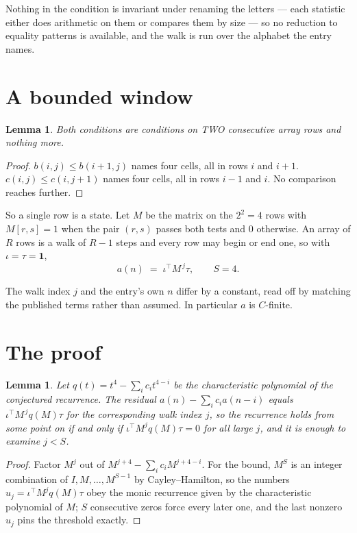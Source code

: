 \documentclass[11pt,a4paper]{article}
\theoremstyle{plain}
\newtheorem{lemma}[theorem]{Lemma}
\theoremstyle{definition}
\begin{document}
Nothing in the condition is invariant under renaming the letters --- each statistic either does
arithmetic on them or compares them by size --- so no reduction to equality patterns is
available, and the walk is run over the alphabet the entry names.

\section{A bounded window}

\begin{lemma}\label{lem:win}
Both conditions are conditions on TWO consecutive array rows and nothing more.
\end{lemma}

\begin{proof}
$b(i,j)\le b(i{+}1,j)$ names four cells, all in rows $i$ and $i+1$. $c(i,j)\le c(i,j{+}1)$
names four cells, all in rows $i-1$ and $i$. No comparison reaches further.
\end{proof}

So a single row is a state. Let $M$ be the matrix on the $2^{2}=4$ rows with
$M[r,s]=1$ when the pair $(r,s)$ passes both tests and $0$ otherwise. An array of $R$ rows is a
walk of $R-1$ steps and every row may begin or end one, so with $\iota=\tau=\mathbf{1}$,
\[
a(n)\;=\;\iota^{\!\top}M^{\,j}\tau ,\qquad S=4.
\]

The walk index $j$ and the entry's own $n$ differ by a constant, read off by matching the
published terms rather than assumed. In particular $a$ is $C$-finite.

\section{The proof}

\begin{lemma}\label{lem:crit}
Let $q(t)=t^{4}-\sum_i c_it^{4-i}$ be the characteristic polynomial of the
conjectured recurrence. The residual $a(n)-\sum_ic_ia(n-i)$ equals
$\iota^{\!\top}M^{\,j}q(M)\tau$ for the corresponding walk index $j$, so the recurrence
holds from some point on if and only if $\iota^{\!\top}M^{j}q(M)\tau=0$ for all large $j$,
and it is enough to examine $j<S$.
\end{lemma}

\begin{proof}
Factor $M^{j}$ out of $M^{j+4}-\sum_ic_iM^{j+4-i}$. For the bound, $M^{S}$
is an integer combination of $I,M,\dots,M^{S-1}$ by Cayley--Hamilton, so the numbers
$u_j=\iota^{\!\top}M^{j}q(M)\tau$ obey the monic recurrence given by the characteristic
polynomial of $M$; $S$ consecutive zeros force every later one, and the last nonzero $u_j$
pins the threshold exactly.
\end{proof}
\end{document}
